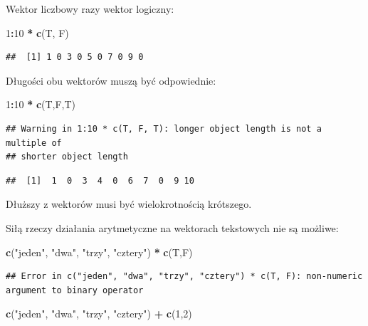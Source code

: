 \documentclass[]{book}
\newenvironment{Shaded}{\begin{snugshade}}{\end{snugshade}}
\newcommand{\KeywordTok}[1]{\textcolor[rgb]{0.13,0.29,0.53}{\textbf{#1}}}
\newcommand{\DecValTok}[1]{\textcolor[rgb]{0.00,0.00,0.81}{#1}}
\newcommand{\StringTok}[1]{\textcolor[rgb]{0.31,0.60,0.02}{#1}}
\newcommand{\OperatorTok}[1]{\textcolor[rgb]{0.81,0.36,0.00}{\textbf{#1}}}
\newcommand{\NormalTok}[1]{#1}
\begin{document}
Wektor liczbowy razy wektor logiczny:

\begin{Shaded}
\begin{Highlighting}[]
\DecValTok{1}\OperatorTok{:}\DecValTok{10} \OperatorTok{*}\StringTok{ }\KeywordTok{c}\NormalTok{(T, F)}
\end{Highlighting}
\end{Shaded}

\begin{verbatim}
##  [1] 1 0 3 0 5 0 7 0 9 0
\end{verbatim}

Długości obu wektorów muszą być odpowiednie:

\begin{Shaded}
\begin{Highlighting}[]
\DecValTok{1}\OperatorTok{:}\DecValTok{10} \OperatorTok{*}\StringTok{ }\KeywordTok{c}\NormalTok{(T,F,T)}
\end{Highlighting}
\end{Shaded}

\begin{verbatim}
## Warning in 1:10 * c(T, F, T): longer object length is not a multiple of
## shorter object length
\end{verbatim}

\begin{verbatim}
##  [1]  1  0  3  4  0  6  7  0  9 10
\end{verbatim}

Dłuższy z wektorów musi być wielokrotnością krótszego.

Siłą rzeczy działania arytmetyczne na wektorach tekstowych nie są
możliwe:

\begin{Shaded}
\begin{Highlighting}[]
\KeywordTok{c}\NormalTok{(}\StringTok{"jeden"}\NormalTok{, }\StringTok{"dwa"}\NormalTok{, }\StringTok{"trzy"}\NormalTok{, }\StringTok{"cztery"}\NormalTok{) }\OperatorTok{*}\StringTok{ }\KeywordTok{c}\NormalTok{(T,F)}
\end{Highlighting}
\end{Shaded}

\begin{verbatim}
## Error in c("jeden", "dwa", "trzy", "cztery") * c(T, F): non-numeric argument to binary operator
\end{verbatim}

\begin{Shaded}
\begin{Highlighting}[]
\KeywordTok{c}\NormalTok{(}\StringTok{"jeden"}\NormalTok{, }\StringTok{"dwa"}\NormalTok{, }\StringTok{"trzy"}\NormalTok{, }\StringTok{"cztery"}\NormalTok{) }\OperatorTok{+}\StringTok{ }\KeywordTok{c}\NormalTok{(}\DecValTok{1}\NormalTok{,}\DecValTok{2}\NormalTok{)}
\end{Highlighting}
\end{Shaded}
\end{document}
